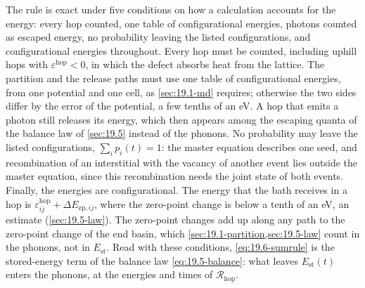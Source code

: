 The rule is exact under five conditions on how a calculation accounts for the energy: every hop counted, one table of configurational energies, photons counted as escaped energy, no probability leaving the listed configurations, and configurational energies throughout. Every hop must be counted, including uphill hops with $\varepsilon^{\mathrm{hop}} < 0$, in which the defect absorbs heat from the lattice. The partition and the release paths must use one table of configurational energies, from one potential and one cell, as \cref{sec:19.1-md} requires; otherwise the two sides differ by the error of the potential, a few tenths of an eV. A hop that emits a photon still releases its energy, which then appears among the escaping quanta of the balance law of \cref{sec:19.5} instead of the phonons. No probability may leave the listed configurations, $\sum_ip_i(t) = 1$: the master equation describes one seed, and recombination of an interstitial with the vacancy of another event lies outside the master equation, since this recombination needs the joint state of both events. Finally, the energies are configurational. The energy that the bath receives in a hop is $\varepsilon^{\mathrm{hop}}_{ij} + \Delta E_{\mathrm{zp},ij}$, where the zero-point change is below a tenth of an eV, an estimate (\cref{sec:19.5-law}). The zero-point changes add up along any path to the zero-point change of the end basin, which \cref{sec:19.1-partition,sec:19.5-law} count in the phonons, not in $E_{\mathrm{st}}$. Read with these conditions, \cref{eq:19.6-sumrule} is the stored-energy term of the balance law \cref{eq:19.5-balance}: what leaves $E_{\mathrm{st}}(t)$ enters the phonons, at the energies and times of $\mathcal{R}_{\mathrm{hop}}$.

